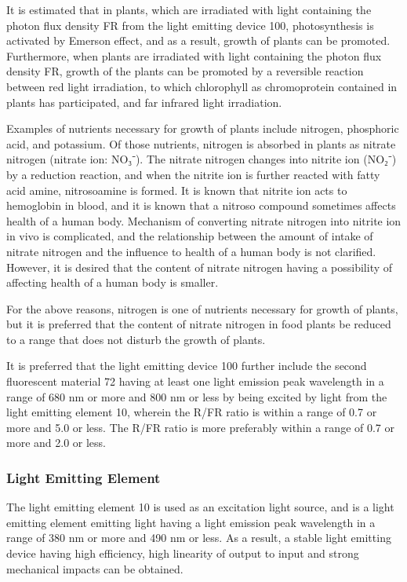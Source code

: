\documentclass[11pt,a4paper]{article}
\begin{document}
It is estimated that in plants, which are irradiated with light containing the photon flux density FR from the light emitting device 100, photosynthesis is activated by Emerson effect, and as a result, growth of plants can be promoted. Furthermore, when plants are irradiated with light containing the photon flux density FR, growth of the plants can be promoted by a reversible reaction between red light irradiation, to which chlorophyll as chromoprotein contained in plants has participated, and far infrared light irradiation.

Examples of nutrients necessary for growth of plants include nitrogen, phosphoric acid, and potassium. Of those nutrients, nitrogen is absorbed in plants as nitrate nitrogen (nitrate ion: NO₃⁻). The nitrate nitrogen changes into nitrite ion (NO₂⁻) by a reduction reaction, and when the nitrite ion is further reacted with fatty acid amine, nitrosoamine is formed. It is known that nitrite ion acts to hemoglobin in blood, and it is known that a nitroso compound sometimes affects health of a human body. Mechanism of converting nitrate nitrogen into nitrite ion in vivo is complicated, and the relationship between the amount of intake of nitrate nitrogen and the influence to health of a human body is not clarified. However, it is desired that the content of nitrate nitrogen having a possibility of affecting health of a human body is smaller.

For the above reasons, nitrogen is one of nutrients necessary for growth of plants, but it is preferred that the content of nitrate nitrogen in food plants be reduced to a range that does not disturb the growth of plants.

It is preferred that the light emitting device 100 further include the second fluorescent material 72 having at least one light emission peak wavelength in a range of 680 nm or more and 800 nm or less by being excited by light from the light emitting element 10, wherein the R/FR ratio is within a range of 0.7 or more and 5.0 or less. The R/FR ratio is more preferably within a range of 0.7 or more and 2.0 or less.

\subsubsection{Light Emitting Element}

The light emitting element 10 is used as an excitation light source, and is a light emitting element emitting light having a light emission peak wavelength in a range of 380 nm or more and 490 nm or less. As a result, a stable light emitting device having high efficiency, high linearity of output to input and strong mechanical impacts can be obtained.
\end{document}

